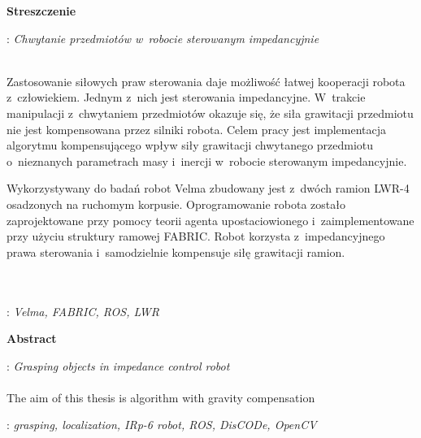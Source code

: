 


\clearpage\mbox{}\thispagestyle{empty}\newpage




%

\clearpage\mbox{}\newpage



\vspace*{\baselineskip}
\begin{center}
	{\large\bfseries Streszczenie}\par\bigskip
\end{center}
: {\itshape Chwytanie przedmiotów w~robocie sterowanym impedancyjnie}
\\\\
{
	Zastosowanie siłowych praw sterowania daje możliwość łatwej kooperacji robota z~człowiekiem. Jednym z~nich jest sterowania impedancyjne. W~trakcie manipulacji z~chwytaniem przedmiotów okazuje się, że siła grawitacji przedmiotu nie jest kompensowana przez silniki robota. Celem pracy jest implementacja algorytmu kompensującego wpływ siły grawitacji chwytanego przedmiotu o~nieznanych parametrach masy i~inercji w~robocie sterowanym impedancyjnie.
	
	Wykorzystywany do badań robot Velma zbudowany jest z~dwóch ramion LWR-4 osadzonych na ruchomym korpusie. Oprogramowanie robota zostało zaprojektowane przy pomocy teorii agenta upostaciowionego i~zaimplementowane przy użyciu struktury ramowej FABRIC. Robot korzysta z~impedancyjnego prawa sterowania i~samodzielnie kompensuje siłę grawitacji ramion. 
}\\\\
\vspace*{0.6\baselineskip}
: {\itshape Velma, FABRIC, ROS, LWR}

\clearpage\mbox{}\newpage


\vspace*{\baselineskip}
\begin{center}
	{\large\bfseries Abstract}\par\bigskip
\end{center}
: {\itshape Grasping objects in impedance control robot}
\\\\
{ 
	The aim of this thesis is algorithm with gravity compensation 
}\par
\vspace*{1\baselineskip}
: {\itshape grasping, localization, IRp-6 robot, ROS, DisCODe, OpenCV}

\clearpage\mbox{}\newpage



\clearpage\mbox{}\newpage




